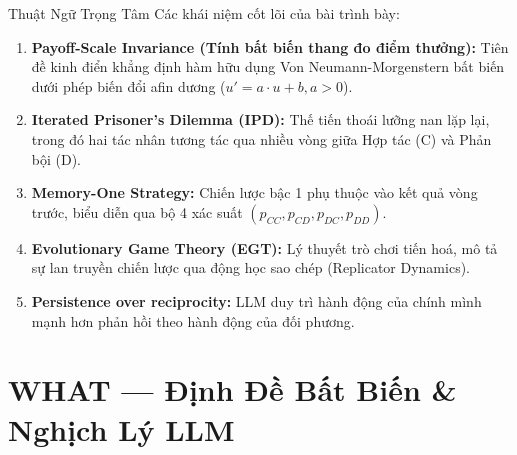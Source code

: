 \documentclass[aspectratio=169,9pt]{beamer}
\begin{document}
\begin{frame}{Thuật Ngữ Trọng Tâm}
  \vspace{0.3em}
  Các khái niệm cốt lõi của bài trình bày:
  
  \vspace{0.5em}
  \begin{enumerate}\small\setlength\itemsep{0.7em}
    \item \textbf{\color{mprimary}Payoff-Scale Invariance (Tính bất biến thang đo điểm thưởng):} Tiên đề kinh điển khẳng định hàm hữu dụng Von Neumann-Morgenstern bất biến dưới phép biến đổi afin dương ($u' = a\cdot u + b, a>0$).
    \item \textbf{\color{mprimary}Iterated Prisoner's Dilemma (IPD):} Thế tiến thoái lưỡng nan lặp lại, trong đó hai tác nhân tương tác qua nhiều vòng giữa Hợp tác (C) và Phản bội (D).
    \item \textbf{\color{mprimary}Memory-One Strategy:} Chiến lược bậc 1 phụ thuộc vào kết quả vòng trước, biểu diễn qua bộ 4 xác suất $(p_{CC}, p_{CD}, p_{DC}, p_{DD})$.
    \item \textbf{\color{mprimary}Evolutionary Game Theory (EGT):} Lý thuyết trò chơi tiến hoá, mô tả sự lan truyền chiến lược qua động học sao chép (Replicator Dynamics).
    \item \textbf{\color{mprimary}Persistence over reciprocity:} LLM duy trì hành động của chính mình mạnh hơn phản hồi theo hành động của đối phương.
  \end{enumerate}
\end{frame}

\section{WHAT — Định Đề Bất Biến \& Nghịch Lý LLM}
\end{document}
